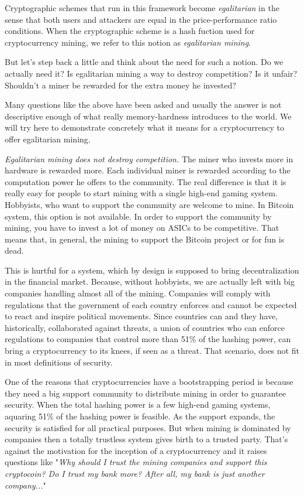 Cryptographic schemes that run in this framework become \emph{egalitarian} in the sense that both users and attackers are equal in the price-performance ratio conditions. When the cryptographic scheme is a hash fuction used for cryptocurrency mining, we refer to this notion as \emph{egalitarian mining}.

But let's step back a little and think about the need for such a notion. Do we actually need it? Is egalitarian mining a way to destroy competition? Is it unfair? Shouldn't a miner be rewarded for the extra money he invested?

Many questions like the above have been asked and usually the answer is not descriptive enough of what really memory-hardness introduces to the world. We will try here to demonstrate concretely what it means for a cryptocurrency to offer egalitarian mining.

\emph{Egalitarian mining does not destroy competition.} The miner who invests more in hardware is rewarded more. Each individual miner is rewarded according to the computation power he offers to the community. The real difference is that it is really easy for people to start mining with a single high-end gaming system. Hobbyists, who want to support the community are welcome to mine. In Bitcoin system, this option is not available. In order to support the community by mining, you have to invest a lot of money on ASICs to be competitive. That means that, in general, the mining to support the Bitcoin project or for fun is dead.

This is hurtful for a system, which by design is supposed to bring decentralization in the financial market. Because, without hobbyists, we are actually left with big companies handling almost all of the mining. Companies will comply with regulations that the government of each country enforces and cannot be expected to react and inspire political movements. Since countries can and they have, historically, collaborated against threats, a union of countries who can enforce regulations to companies that control more than 51\% of the hashing power, can bring a cryptocurrency to its knees, if seen as a threat. That scenario, does not fit in most definitions of security.

One of the reasons that cryptocurrencies have a bootstrapping period is because they need a big support community to distribute mining in order to guarantee security. When the total hashing power is a few high-end gaming systems, aquaring 51\% of the hashing power is feasible. As the support expands, the security is satisfied for all practical purposes. But when mining is dominated by companies then a totally trustless system gives birth to a trusted party. That's against the motivation for the inception of a cryptocurrency and it raises questions like "\emph{Why should I trust the mining companies and support this cryptocoin? Do I trust my bank more? After all, my bank is just another company...}"
\pagebreak

